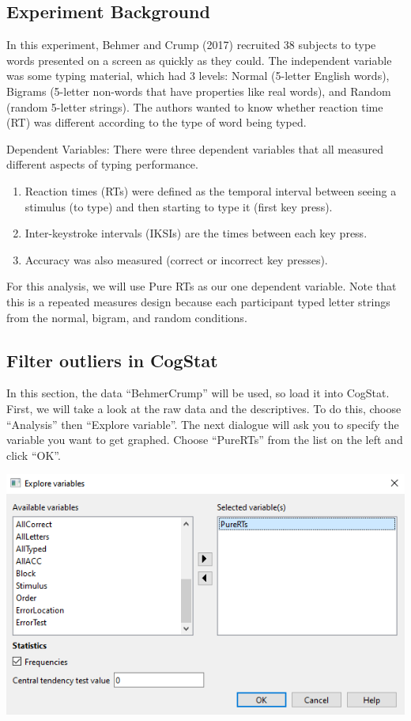 \documentclass[
]{book}
\begin{document}
\hypertarget{experiment-background-7}{%
\subsection{Experiment Background}\label{experiment-background-7}}

In this experiment, Behmer and Crump (2017) recruited 38 subjects to type words presented on a screen as quickly as they could. The independent variable was some typing material, which had 3 levels: Normal (5-letter English words), Bigrams (5-letter non-words that have properties like real words), and Random (random 5-letter strings). The authors wanted to know whether reaction time (RT) was different according to the type of word being typed.

Dependent Variables: There were three dependent variables that all measured different aspects of typing performance.

\begin{enumerate}
\def\labelenumi{(\arabic{enumi})}
\item
  Reaction times (RTs) were defined as the temporal interval between seeing a stimulus (to type) and then starting to type it (first key press).
\item
  Inter-keystroke intervals (IKSIs) are the times between each key press.
\item
  Accuracy was also measured (correct or incorrect key presses).
\end{enumerate}

For this analysis, we will use Pure RTs as our one dependent variable. Note that this is a repeated measures design because each participant typed letter strings from the normal, bigram, and random conditions.

\hypertarget{filter-outliers-in-cogstat}{%
\subsection{Filter outliers in CogStat}\label{filter-outliers-in-cogstat}}

In this section, the data ``BehmerCrump'' will be used, so load it into CogStat. First, we will take a look at the raw data and the descriptives. To do this, choose ``Analysis'' then ``Explore variable''. The next dialogue will ask you to specify the variable you want to get graphed. Choose ``PureRTs'' from the list on the left and click ``OK''.

\includegraphics{img/ch9/9.3expvar_window.png}
\end{document}
